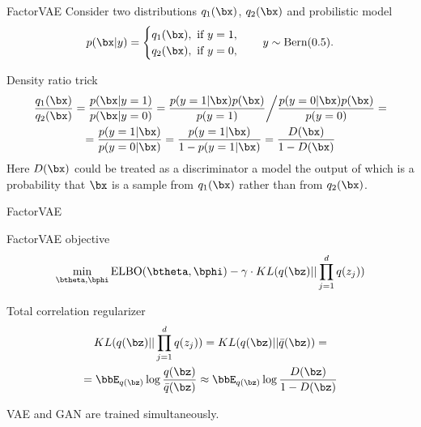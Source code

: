 \begin{frame}{FactorVAE}
	Consider two distributions $q_1(\bx)$, $q_2(\bx)$ and probilistic model
	\[
		p(\bx | y) = \begin{cases}
			q_1(\bx), \text{ if } y = 1, \\
			q_2(\bx), \text{ if } y = 0,
		\end{cases}
		\quad 
		y \sim \text{Bern}(0.5).
	\]
	\begin{block}{Density ratio trick}
		\vspace{-0.5cm}
		\begin{multline*}
			\frac{q_1(\bx)}{q_2(\bx)} = \frac{p(\bx | y = 1)}{p(\bx | y = 0)} = \frac{p(y = 1 | \bx) p(\bx)}{p(y=1)} \bigg/ \frac{p(y = 0 | \bx) p(\bx)}{p(y=0)} = \\
			= \frac{p(y = 1 | \bx)}{p(y = 0 | \bx)} = \frac{p(y = 1 | \bx)}{1 - p(y = 1 | \bx)} = \frac{D(\bx)}{1 - D(\bx)}
		\end{multline*}
	Here $D(\bx)$ could be treated as a discriminator a model the output of which is a probability that $\bx$ is a sample
	from $q_1(\bx)$ rather than from $q_2(\bx)$.
	\end{block}

\end{frame}
\begin{frame}{FactorVAE}
	
	\begin{block}{FactorVAE objective}
		\vspace{-0.3cm}
		\[
		\min_{\btheta, \bphi} \text{ELBO}(\btheta, \bphi) - \gamma \cdot KL(q(\bz) || \prod_{j=1}^d q(z_j))
		\]
		\vspace{-0.3cm}
	\end{block}
	
	\begin{block}{Total correlation regularizer}
		\vspace{-0.7cm}
		\begin{multline*}
		KL(q(\bz) || \prod_{j=1}^d q(z_j)) = KL(q(\bz) || \bar{q}(\bz)) = \\ =\bbE_{q(\bz)} \log \frac{q(\bz)}{\bar{q}(\bz)} \approx \bbE_{q(\bz)} \log \frac{D(\bz)}{1 - D(\bz)}
		\end{multline*}
		\vspace{-0.3cm}
	\end{block}
	VAE and GAN are trained simultaneously.

\end{frame}
